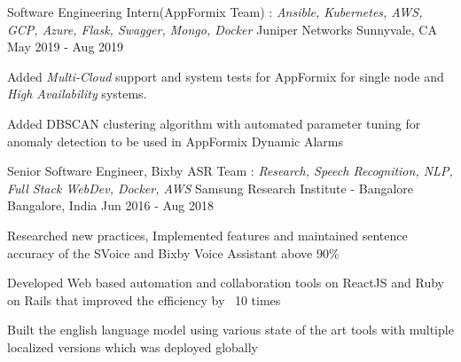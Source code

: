 

\begin{cventries}

    \cventry
      {Software Engineering Intern(AppFormix Team) : \textit{Ansible, Kubernetes, AWS, GCP, Azure, Flask, Swagger, Mongo, Docker}} %
      {Juniper Networks} %
      {Sunnyvale, CA} %
      {May 2019 - Aug 2019} %
      {
        \begin{cvitems}
        \item{Added \textit{Multi-Cloud} support and system tests for AppFormix for single node and \textit{High Availability} systems.}
        \item{Added DBSCAN clustering algorithm with automated parameter tuning for anomaly detection to be used in AppFormix Dynamic Alarms}
        \end{cvitems}
      }

  \cventry
    {Senior Software Engineer, Bixby ASR Team : \textit{Research, Speech Recognition, NLP, Full Stack WebDev, Docker, AWS}} %
    {Samsung Research Institute - Bangalore} %
    {Bangalore, India} %
    {Jun 2016 - Aug 2018} %
    {
      \begin{cvitems}
      \item{Researched new practices, Implemented features and maintained sentence accuracy of the SVoice and Bixby Voice Assistant above 90\%}
      \item{Developed Web based automation and collaboration tools on ReactJS and Ruby on Rails that improved the efficiency by ~10 times}
      \item{Built the english language model using various state of the art tools with multiple localized versions which was deployed globally}
      \end{cvitems}
    }


\end{cventries}
